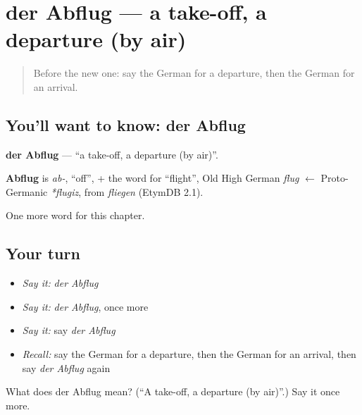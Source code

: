 \section[der Abflug]{der Abflug — a take-off, a departure (by air)}

\label{lesson:GE-C192-abflug}



\begin{quote}
Before the new one: say the German for a departure, then the German for an arrival.
\end{quote}

\subsection*{You'll want to know: der Abflug}
\textbf{der Abflug} — \textquotedblleft{}a take-off, a departure (by air)\textquotedblright{}.

\begin{cousinweb}
\textbf{Abflug} is \emph{ab-}, \textquotedblleft{}off\textquotedblright{}, + the word for \textquotedblleft{}flight\textquotedblright{}, Old High German \emph{flug} $\leftarrow$ Proto-Germanic \emph{*flugiz}, from \emph{fliegen} (EtymDB 2.1).
\end{cousinweb}

\begin{grammarlens}[title={What you've built}]
One more word for this chapter.
\end{grammarlens}

\subsection*{Your turn}
\begin{itemize}
\raggedright
  \item \emph{Say it:} \emph{der Abflug}
  \item \emph{Say it:} \emph{der Abflug}, once more
  \item \emph{Say it:} say \emph{der Abflug}
  \item \emph{Recall:} say the German for a departure, then the German for an arrival, then say \emph{der Abflug} again
\end{itemize}

\begin{tcolorbox}[breakable,colback=teal!4,colframe=teal!35!black,title={Before you move on}]
What does der Abflug mean? (\textquotedblleft{}A take-off, a departure (by air)\textquotedblright{}.) Say it once more.
\end{tcolorbox}
